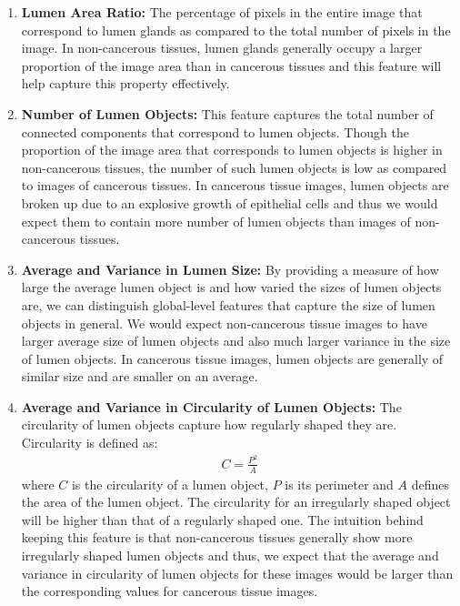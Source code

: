 \begin{enumerate}
\item \textbf{Lumen Area Ratio:} The percentage of pixels in the entire image that correspond to lumen glands as compared to the total number of pixels in the image. In non-cancerous tissues, lumen glands generally occupy a larger proportion of the image area than in cancerous tissues and this feature will help capture this property effectively.

\item \textbf{Number of Lumen Objects:} This feature captures the total number of connected components that correspond to lumen objects. Though the proportion of the image area that corresponds to lumen objects is higher in non-cancerous tissues, the number of such lumen objects is low as compared to images of cancerous tissues. In cancerous tissue images, lumen objects are broken up due to an explosive growth of epithelial cells and thus we would expect them to contain more number of lumen objects than images of non-cancerous tissues.

\item \textbf{Average and Variance in Lumen Size:} By providing a measure of how large the average lumen object is and how varied the sizes of lumen objects are, we can distinguish global-level features that capture the size of lumen objects in general. We would expect non-cancerous tissue images to have larger average size of lumen objects and also much larger variance in the size of lumen objects. In cancerous tissue images, lumen objects are generally of similar size and are smaller on an average.

\item \textbf{Average and Variance in Circularity of Lumen Objects:} The circularity of lumen objects capture how regularly shaped they are. Circularity is defined as:\\
\begin{align*}
C = \frac{P^2}{A}
\end{align*}
where $C$ is the circularity of a lumen object, $P$ is its perimeter and $A$ defines the area of the lumen object.
The circularity for an irregularly shaped object will be higher than that of a regularly shaped one.
The intuition behind keeping this feature is that non-cancerous tissues generally show more irregularly shaped lumen objects and thus, we expect that the average and variance in circularity of lumen objects for these images would be larger than the corresponding values for cancerous tissue images.


\end{enumerate}
